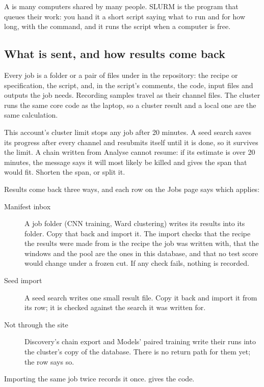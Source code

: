 \begin{plainterms}
A  is many computers shared by many people. SLURM is the program that
queues their work: you hand it a short script saying what to run and for how long, with the
 command, and it runs the script when a computer is free.
\end{plainterms}

\subsection{What is sent, and how results come back}
Every job is a folder or a pair of files under  in the repository: the recipe or
specification, the  script, and, in the script's comments, the code, input files and
outputs the job needs. Recording samples travel as their channel files. The cluster runs the same
core code as the laptop, so a cluster result and a local one are the same calculation.

\begin{watchout}
This account's cluster limit stops any job after 20 minutes. A seed search saves its progress after
every channel and resubmits itself until it is done, so it survives the limit. A chain written from
Analyse cannot resume: if its estimate is over 20 minutes, the message says it will most likely be
killed and gives the span that would fit. Shorten the span, or split it.
\end{watchout}

Results come back three ways, and each row on the Jobs page says which applies:
\begin{description}
\item[Manifest inbox] A job folder (CNN training, Ward clustering) writes its results into its
   folder. Copy that back and import it. The import checks that the recipe the results
  were made from is the recipe the job was written with, that the windows and the pool are the ones
  in this database, and that no test score would change under a frozen cut. If any check fails,
  nothing is recorded.
\item[Seed import] A seed search writes one small result file. Copy it back and import it from its
  row; it is checked against the search it was written for.
\item[Not through the site] Discovery's chain export and Models' paired training write their runs
  into the cluster's copy of the database. There is no return path for them yet; the row says so.
\end{description}
Importing the same job twice records it once.  gives the code.

